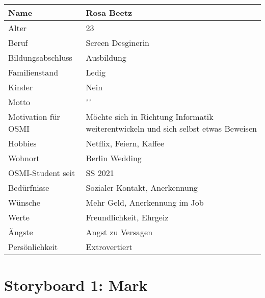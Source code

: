 \documentclass{article}
\begin{document}
\begin{tabularx}{\textwidth}{|l|X|}
	\hline
	Name                & Rosa Beetz                                          \\
	\hline
	Alter               & 23                                                  \\
	\hline
	Beruf               & Screen Desginerin                                   \\
	\hline
	Bildungsabschluss   & Ausbildung                                          \\
	\hline
	Familienstand       & Ledig                                               \\
	\hline
	Kinder              & Nein                                                \\
	\hline
	Motto               & ""                                                  \\
	\hline
	Motivation für OSMI & Möchte sich in Richtung Informatik weiterentwickeln
	und sich selbst etwas Beweisen                                            \\
	\hline
	Hobbies             & Netflix, Feiern, Kaffee                             \\
	\hline
	Wohnort             & Berlin Wedding                                      \\
	\hline
	OSMI-Student seit   & SS 2021                                             \\
	\hline
	Bedürfnisse         & Sozialer Kontakt, Anerkennung                       \\
	\hline
	Wünsche             & Mehr Geld, Anerkennung im Job                       \\
	\hline
	Werte               & Freundlichkeit, Ehrgeiz                             \\
	\hline
	Ängste              & Angst zu Versagen                                   \\
	\hline
	Persönlichkeit      & Extrovertiert                                       \\
	\hline
\end{tabularx}



\newpage

\section{Storyboard 1: Mark}
\end{document}
